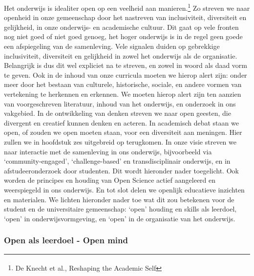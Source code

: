 \documentclass{jote-book}
\begin{document}
	Het onderwijs is idealiter open op een veelheid aan manieren.\footnote{\textsuperscript{ }De Knecht et al., Reshaping the Academic Self} Zo streven we naar openheid in onze gemeenschap door het nastreven van inclusiviteit, diversiteit en gelijkheid, in onze onderwijs- en academische cultuur. Dit gaat op vele fronten nog niet goed of niet goed genoeg, het hoger onderwijs is in de regel geen goede een afspiegeling van de samenleving. Vele signalen duiden op gebrekkige inclusiviteit, diversiteit en gelijkheid in zowel het onderwijs als de organisatie. Belangrijk is dus dit wel expliciet na te streven, en zowel in woord als daad vorm te geven. Ook in de inhoud van onze curricula moeten we hierop alert zijn: onder meer door het bestaan van culturele, historische, sociale, en andere vormen van vertekening te herkennen en erkennen. We moeten hierop alert zijn ten aanzien van voorgeschreven literatuur, inhoud van het onderwijs, en onderzoek in ons vakgebied. In de ontwikkeling van denken streven we naar open geesten, die divergent en creatief kunnen denken en acteren. In academisch debat staan we open, of zouden we open moeten staan, voor een diversiteit aan meningen. Hier zullen we in hoofdstuk zes uitgebreid op terugkomen. In onze visie streven we naar interactie met de samenleving in ons onderwijs, bijvoorbeeld via ‘community-engaged', ‘challenge-based' en transdisciplinair onderwijs, en in afstudeeronderzoek door studenten. Dit wordt hieronder nader toegelicht. Ook worden de principes en houding van Open Science actief aangeleerd en weerspiegeld in ons onderwijs. En tot slot delen we openlijk educatieve inzichten en materialen. We lichten hieronder nader toe wat dit zou betekenen voor de student en de universitaire gemeenschap: ‘open' houding en skills als leerdoel, ‘open' in onderwijsvormgeving, en ‘open' in de organisatie van het onderwijs.



	\subsubsection{Open als leerdoel - Open mind}
\end{document}
